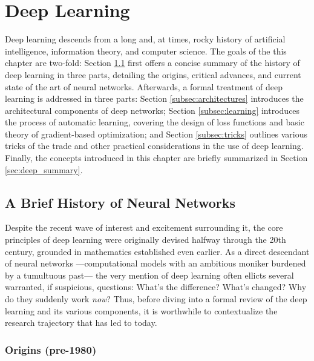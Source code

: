

\graphicspath{{3/figures/}}

\chapter{Deep Learning}
\label{chp:deep_learning}


Deep learning descends from a long and, at times, rocky history of artificial intelligence, information theory, and computer science.
The goals of the this chapter are two-fold:
Section \ref{sec:background} first offers a concise summary of the history of deep learning in three parts, detailing the origins, critical advances, and current state of the art of neural networks.
Afterwards, a formal treatment of deep learning is addressed in three parts:
Section \ref{subsec:architectures} introduces the architectural components of deep networks;
Section \ref{subsec:learning} introduces the process of automatic learning, covering the design of loss functions and basic theory of gradient-based optimization;
and Section \ref{subsec:tricks} outlines various tricks of the trade and other practical considerations in the use of deep learning.
Finally, the concepts introduced in this chapter are briefly summarized in Section \ref{sec:deep_summary}.


\section{A Brief History of Neural Networks}
\label{sec:background}
Despite the recent wave of interest and excitement surrounding it, the core principles of deep learning were originally devised halfway through the 20th century, grounded in mathematics established even earlier.
As a direct descendant of neural networks ---computational models with an ambitious moniker burdened by a tumultuous past--- the very mention of deep learning often ellicts several warranted, if suspicious, questions: What's the difference? What's changed? Why do they suddenly work \emph{now}?
Thus, before diving into a formal review of the deep learning and its various components, it is worthwhile to contextualize the research trajectory that has led to today.


\subsection{Origins (pre-1980)}
\label{subsec:origins}

